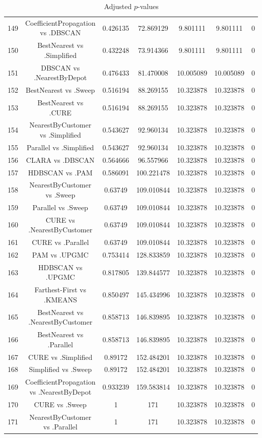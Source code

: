 \documentclass[a4paper,10pt]{article}
\begin{document}
\begin{landscape}
\begin{table}[!htp]
\begin{tabular}{ccccccc}
149&CoefficientPropagation vs .DBSCAN&0.426135&72.869129&9.801111&9.801111&0\\
150&BestNearest vs .Simplified&0.432248&73.914366&9.801111&9.801111&0\\
151&DBSCAN vs .NearestByDepot&0.476433&81.470008&10.005089&10.005089&0\\
152&BestNearest vs .Sweep&0.516194&88.269155&10.323878&10.323878&0\\
153&BestNearest vs .CURE&0.516194&88.269155&10.323878&10.323878&0\\
154&NearestByCustomer vs .Simplified&0.543627&92.960134&10.323878&10.323878&0\\
155&Parallel vs .Simplified&0.543627&92.960134&10.323878&10.323878&0\\
156&CLARA vs .DBSCAN&0.564666&96.557966&10.323878&10.323878&0\\
157&HDBSCAN vs .PAM&0.586091&100.221478&10.323878&10.323878&0\\
158&NearestByCustomer vs .Sweep&0.63749&109.010844&10.323878&10.323878&0\\
159&Parallel vs .Sweep&0.63749&109.010844&10.323878&10.323878&0\\
160&CURE vs .NearestByCustomer&0.63749&109.010844&10.323878&10.323878&0\\
161&CURE vs .Parallel&0.63749&109.010844&10.323878&10.323878&0\\
162&PAM vs .UPGMC&0.753414&128.833859&10.323878&10.323878&0\\
163&HDBSCAN vs .UPGMC&0.817805&139.844577&10.323878&10.323878&0\\
164&Farthest-First vs .KMEANS&0.850497&145.434996&10.323878&10.323878&0\\
165&BestNearest vs .NearestByCustomer&0.858713&146.839895&10.323878&10.323878&0\\
166&BestNearest vs .Parallel&0.858713&146.839895&10.323878&10.323878&0\\
167&CURE vs .Simplified&0.89172&152.484201&10.323878&10.323878&0\\
168&Simplified vs .Sweep&0.89172&152.484201&10.323878&10.323878&0\\
169&CoefficientPropagation vs .NearestByDepot&0.933239&159.583814&10.323878&10.323878&0\\
170&CURE vs .Sweep&1&171&10.323878&10.323878&0\\
171&NearestByCustomer vs .Parallel&1&171&10.323878&10.323878&0\\
\hline
\end{tabular}
\caption{Adjusted $p$-values}
\end{table}

\end{landscape}
\end{document}
